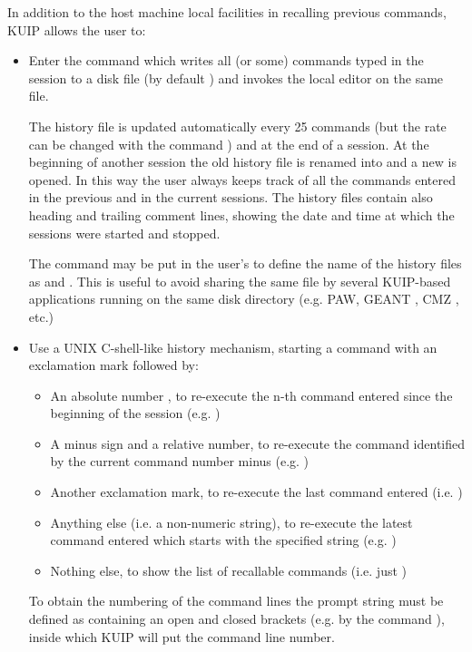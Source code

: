 In addition to the host machine local facilities in recalling
previous commands, KUIP allows the user to:
\begin{itemize}
\item
Enter the command  which writes all (or some)
commands typed in the session to a disk file (by default )
and invokes the local editor on the same file.

The history file is updated automatically every 25 commands
(but the rate can be changed with the command )
and at the end of a session.
At the beginning of another session the old history file 
is renamed into 
and a new  is opened.
In this way the user always keeps track of all the commands entered in
the previous and in the current sessions.
The history files contain also heading
and trailing comment lines, showing the date and
time at which the sessions were started and stopped.

The command  may be put in the user's
 to define the name of the history files
as  and .
This is useful to avoid sharing the same  file
by several KUIP-based applications running on the same disk directory
(e.g. PAW, GEANT \cite{bib-GEANT3}, CMZ \cite{bib-CMZ}, etc.)

\item
Use a UNIX C-shell-like history mechanism,
starting a command with an exclamation mark followed by:
\begin{itemize}
\item
An absolute number , to re-execute the n-th command entered
since the beginning of the session (e.g. )
\item
A minus sign and a relative number, to re-execute the command
identified by the current command number minus  (e.g. )
\item
Another exclamation mark,
to re-execute the last command entered (i.e. \Command{!!})
\item
Anything else (i.e. a non-numeric string),
to re-execute the latest command entered which starts with the
specified string (e.g. )
\item
Nothing else,
to show the list of recallable commands (i.e. just \Command{!})
\end{itemize}

To obtain the numbering of the command lines the prompt string
must be defined as
containing an open and closed
brackets (e.g. by the command ),
inside which KUIP will put the command line number.
\end{itemize}
%
%
